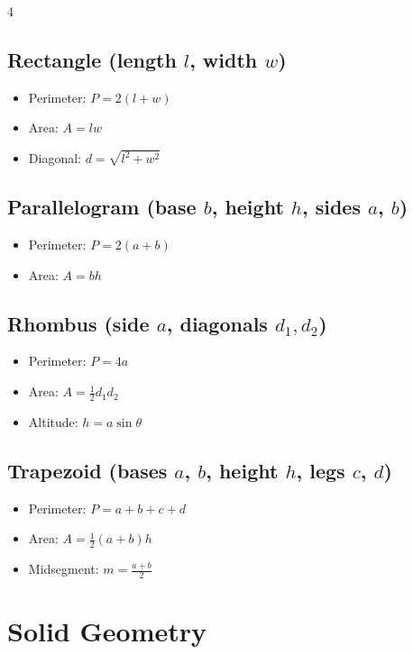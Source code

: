 \begin{multicols*}{4}
\subsection*{Rectangle (length $l$, width $w$)}
\begin{itemize}
    \item Perimeter: $P = 2(l + w)$
    \item Area: $A = lw$
    \item Diagonal: $d = \sqrt{l^2 + w^2}$
\end{itemize}

\subsection*{Parallelogram (base $b$, height $h$, sides $a$, $b$)}
\begin{itemize}
    \item Perimeter: $P = 2(a + b)$
    \item Area: $A = bh$
\end{itemize}

\subsection*{Rhombus (side $a$, diagonals $d_1, d_2$)}
\begin{itemize}
    \item Perimeter: $P = 4a$
    \item Area: $A = \frac{1}{2}d_1d_2$
    \item Altitude: $h = a\sin\theta$
\end{itemize}

\subsection*{Trapezoid (bases $a$, $b$, height $h$, legs $c$, $d$)}
\begin{itemize}
    \item Perimeter: $P = a + b + c + d$
    \item Area: $A = \frac{1}{2}(a + b)h$
    \item Midsegment: $m = \frac{a + b}{2}$
\end{itemize}




\section{Solid Geometry}


\end{multicols*}
